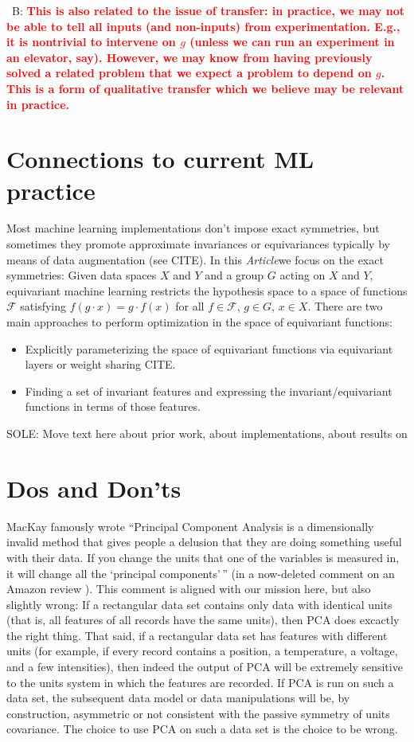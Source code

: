 \documentclass{article}
\theoremstyle{plain}
\theoremstyle{definition}
\theoremstyle{remark}
\newcommand{\documentname}{\textsl{Article}}
\newcommand{\bernhard}[1]{~B: \textcolor{red}{\textbf{#1}}}
\begin{document}
\bernhard{This is also related to the issue of transfer: in practice, we may not be able to tell all inputs (and non-inputs) from experimentation. E.g., it is nontrivial to intervene on $g$ (unless we can run an experiment in an elevator, say). However, we may know from having previously solved a related problem that we expect a problem to depend on $g$. This is a form of qualitative transfer which we believe may be relevant in practice.}

\section{Connections to current ML practice}\label{sec:practice}

Most machine learning implementations don't impose exact symmetries, but sometimes they promote approximate invariances or equivariances typically by means of data augmentation (see CITE). In this \documentname we focus on the exact symmetries: Given data spaces $X$ and $Y$ and a group $G$ acting on $X$ and $Y$, equivariant machine learning restricts the hypothesis space to a space of functions $\mathcal F$ satisfying  $f(g\cdot x) = g \cdot f(x)$ for all $f\in \mathcal F$, $g\in G$, $x\in X$. There are two main approaches to perform optimization in the space of equivariant functions:
\begin{itemize}
    \item Explicitly parameterizing the space of equivariant functions via equivariant layers or weight sharing CITE.
    \item Finding a set of invariant features and expressing the invariant/equivariant functions in terms of those features.
\end{itemize}

SOLE: Move text here about prior work, about implementations, about results on 

\section{Dos and Don'ts}\label{sec:dos}

MacKay famously wrote ``Principal Component Analysis is a dimensionally invalid method that gives people a delusion that they are doing something useful with their data. If you change the units that one of the variables is measured in, it will change all the `principal components'\,'' (in a now-deleted comment on an Amazon review \citealt{muldoonmedium}).
This comment is aligned with our mission here, but also slightly wrong: If a rectangular data set contains only data with identical units (that is, all features of all records have the same units), then PCA does excactly the right thing.
That said, if a rectangular data set has features with different units (for example, if every record contains a position, a temperature, a voltage, and a few intensities), then indeed the output of PCA will be extremely sensitive to the units system in which the features are recorded.
If PCA is run on such a data set, the subsequent data model or data manipulations will be, by construction, asymmetric or not consistent with the passive symmetry of units covariance.
The choice to use PCA on such a data set is the choice to be wrong.
\end{document}
